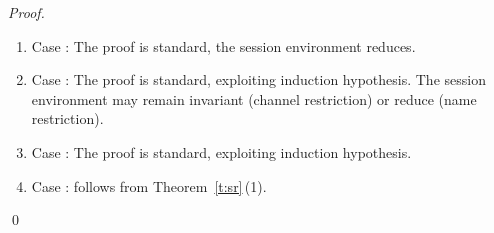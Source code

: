 \begin{proof}
\begin{enumerate}[$-$]
		\item	Case :
			The proof is standard, the session environment reduces.

		\item	Case :
			The proof is standard, exploiting induction hypothesis.
			The session environment may remain invariant (channel restriction)  or reduce (name restriction).

		\item	Case :
			The proof is standard, exploiting induction hypothesis. 

		\item	Case :
			follows from Theorem~\ref{t:sr}\,(1).
	\end{enumerate}
	\qed
\end{proof}
